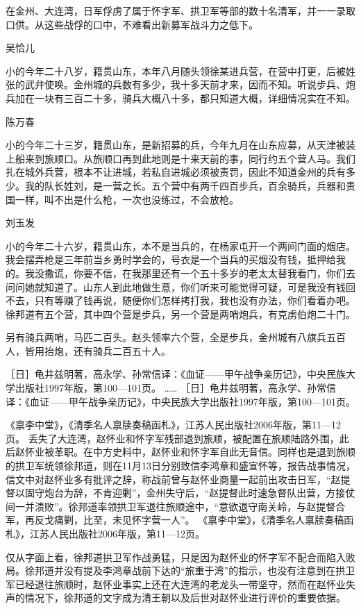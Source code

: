 \documentclass[12pt,UTF8]{ctexbook}
\begin{document}
在金州、大连湾，日军俘虏了属于怀字军、拱卫军等部的数十名清军，并一一录取口供。从这些战俘的口中，不难看出新募军战斗力之低下。

吴恰儿

小的今年二十八岁，籍贯山东，本年八月随头领徐某进兵营，在营中打更，后被姓张的武弁使唤。金州城的兵数有多少，我十多天前才来，因而不知。听说步兵、炮兵加在一块有三百二十多，骑兵大概八十多，都只知道大概，详细情况实在不知。

陈万春

小的今年二十三岁，籍贯山东，是新招募的兵，今年九月在山东应募，从天津被装上船来到旅顺口。从旅顺口再到此地则是十来天前的事，同行约五个营人马。我们扎在城外兵营，根本不让进城，若私自进城必须被责罚，因此不知道金州的兵有多少。我的队长姓刘，是一营之长。五个营中有两千四百步兵，百余骑兵，兵器和贵国一样，叫不出是什么枪，一次也没练过，不会放枪。

刘玉发

小的今年二十六岁，籍贯山东，本不是当兵的，在杨家屯开一个两间门面的烟店。我会摆弄枪是三年前当乡勇时学会的，号衣是一个当兵的买烟没有钱，抵押给我的。我没撒谎，你要不信，在我那里还有一个五十多岁的老太太替我看门，你们去问问她就知道了。山东人到此地做生意，你们听来可能觉得可疑，可是我没有钱回不去，只有等赚了钱再说，随便你们怎样拷打我，我也没有办法，你们看着办吧。徐邦道有五个营，其中四个营是步兵，另一个营是两哨炮兵，有克虏伯炮二十门。

另有骑兵两哨，马匹二百头。赵头领率六个营，全是步兵，金州城有八旗兵五百人，皆用抬炮，还有骑兵二百五十人。

［日］龟井兹明著，高永学、孙常信译：《血证——甲午战争亲历记》，中央民族大学出版社1997年版，第100—101页。
…… ［日］龟井兹明著，高永学、孙常信译：《血证——甲午战争亲历记》，中央民族大学出版社1997年版，第100—101页。

《禀李中堂》，《清季名人禀牍奏稿函札》，江苏人民出版社2006年版，第11—12页。
丢失了大连湾，赵怀业和怀字军残部退到旅顺，被配置在旅顺陆路外围，此后赵怀业被革职。在中方史料中，赵怀业和怀字军自此无音信。同样也是退到旅顺的拱卫军统领徐邦道，则在11月13日分别致信李鸿章和盛宣怀等，报告战事情况，信文中对赵怀业多有批评之辞，称战前曾与赵怀业商量一起前出攻击日军，“赵提督以固守炮台为辞，不肯迎剿”，金州失守后，“赵提督此时速急督队出营，方接仗间一并溃败”。徐邦道率领拱卫军退往旅顺途中，“意欲退守南关岭，与赵提督合军，再反戈痛剿，比至，未见怀字营一人”。 《禀李中堂》，《清季名人禀牍奏稿函札》，江苏人民出版社2006年版，第11—12页。

仅从字面上看，徐邦道拱卫军作战勇猛，只是因为赵怀业的怀字军不配合而陷入败局。徐邦道并没有提及李鸿章战前下达的“旅重于湾”的指示，也没有注意到在拱卫军已经退往旅顺时，赵怀业事实上还在大连湾的老龙头一带坚守，然而在赵怀业失声的情况下，徐邦道的文字成为清王朝以及后世对赵怀业进行评价的重要依据。
\end{document}
